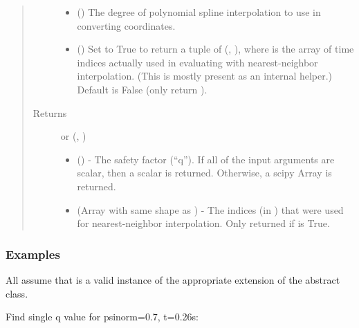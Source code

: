 \documentclass[letterpaper,10pt,english]{sphinxmanual}
\begin{document}
\begin{fulllineitems}
\begin{fulllineitems}
\begin{quote}
\begin{description}
\begin{itemize}
\item {} 
 () \textendash{} The degree of polynomial spline interpolation to
use in converting coordinates.

\item {} 
 () \textendash{} Set to True to return a tuple of (,
), where  is the array of time indices
actually used in evaluating  with nearest-neighbor
interpolation. (This is mostly present as an internal helper.)
Default is False (only return ).

\end{itemize}

\item[{Returns}] \leavevmode

 or (, )
\begin{itemize}
\item {} 
 () - The safety factor (“q”). If
all of the input arguments are scalar, then a scalar is returned.
Otherwise, a scipy Array is returned.

\item {} 
 (Array with same shape as ) - The indices
(in ) that were used for
nearest-neighbor interpolation. Only returned if  is
True.

\end{itemize}


\end{description}\end{quote}
\subsubsection*{Examples}

All assume that  is a valid instance of the appropriate
extension of the {\hyperref[\detokenize{eqtools:eqtools.core.Equilibrium}]{}} abstract class.

Find single q value for psinorm=0.7, t=0.26s:

\begin{sphinxVerbatim}[commandchars=\\\{\}]
   
\end{sphinxVerbatim}


\end{fulllineitems}
\end{fulllineitems}
\end{document}
